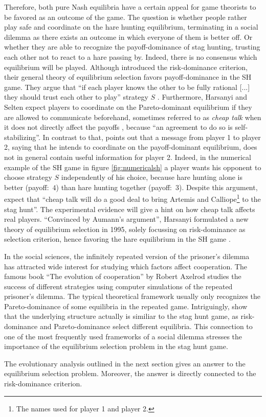 Therefore, both pure Nash equilibria have a 
certain appeal for game theorists to be
favored as an outcome of the game. 
The question is whether people rather play
safe and coordinate on the hare hunting equilibrium, terminating in a social
dilemma as there exists an outcome in which everyone of them is better off.
Or whether they are able to recognize the payoff-dominance of stag hunting, 
trusting each other not to react to a hare passing by.
Indeed, there is no consensus which equilibrium will be played. 
Although \textcite{harsanyi_general_1988} introduced the 
risk-dominance criterion, their general theory of equilibrium 
selection favors payoff-dominance in the SH game. They argue that
``if each player knows the other to be fully rational [...] they should trust
each other to play'' strategy $S$ \parencite[89]{harsanyi_general_1988}.
Furthermore, Harsanyi and Selten expect players to coordinate on the
Pareto-dominant equilibrium if they are allowed to communicate beforehand,
sometimes referred to as \textit{cheap talk} when it does not directly affect
the payoffs \parencite[104]{farrell_cheap_1996}, 
because ``an agreement to do so is self-stabilizing''. 
In contrast to that,
\textcite{aumann_nash_1990} points out that a message from player 1 to 
player 2, saying that he intends to coordinate on the payoff-dominant 
equilibrium, does not in general contain useful information for player 2. 
Indeed, in the numerical example of the SH game in figure \ref{fig:numericalsh} 
a player wants his
opponent to choose strategy $S$ independently of his choice, because
hare hunting alone is better (payoff:\ $4$) than hare hunting together 
(payoff:\ $3$).
Despite this argument, 
\textcite[114]{farrell_cheap_1996} expect that 
``cheap talk will do a good deal to
bring Artemis and Calliope\footnote{The names
\textcite{farrell_cheap_1996} used for player 1 and player 2.} 
to the stag hunt''. The experimental evidence will give a hint on how cheap
talk affects real players. 
``Convinced by Aumann's argument'', Harsanyi formulated a new theory
of equilibrium selection in 1995, solely focussing on 
risk-dominance as selection criterion, hence favoring the hare 
equilibrium in the SH game \parencite[92,94,96]{harsanyi_new_1995}. 

In the social sciences, the infinitely repeated version of the
prisoner's dilemma has attracted wide interest for studying which factors 
affect cooperation. The famous book ``The evolution of cooperation'' by Robert
Axelrod studies the success of different strategies using computer 
simulations of the repeated prisoner's dilemma. The typical theoretical
framework usually only recognizes the Pareto-dominance of some equilibria
in the repeated game. Intriguingly, \textcite{blonski_prisoners_2015} show
that the underlying structure actually is similiar to the stag hunt game, 
as risk-dominance and Pareto-dominance select different equilibria. 
This connection to 
one of the most frequently used frameworks of a social dilemma stresses the
importance of the equilibrium selection problem in the stag hunt game.

The evolutionary analysis outlined in the next section gives an answer
to the equilibrium selection problem. Moreover, the answer is directly
connected to the risk-dominance criterion.
